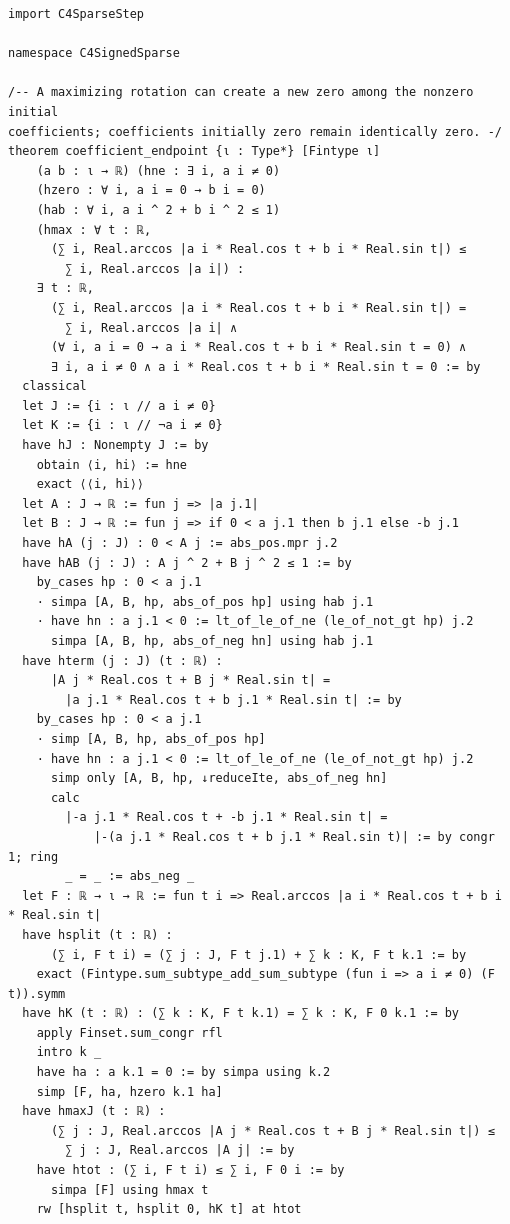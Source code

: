 \documentclass[11pt,a4paper]{article}
\begin{document}
\begin{Verbatim}[breaklines,breakanywhere,fontsize=\footnotesize]
import C4SparseStep

namespace C4SignedSparse

/-- A maximizing rotation can create a new zero among the nonzero initial
coefficients; coefficients initially zero remain identically zero. -/
theorem coefficient_endpoint {ι : Type*} [Fintype ι]
    (a b : ι → ℝ) (hne : ∃ i, a i ≠ 0)
    (hzero : ∀ i, a i = 0 → b i = 0)
    (hab : ∀ i, a i ^ 2 + b i ^ 2 ≤ 1)
    (hmax : ∀ t : ℝ,
      (∑ i, Real.arccos |a i * Real.cos t + b i * Real.sin t|) ≤
        ∑ i, Real.arccos |a i|) :
    ∃ t : ℝ,
      (∑ i, Real.arccos |a i * Real.cos t + b i * Real.sin t|) =
        ∑ i, Real.arccos |a i| ∧
      (∀ i, a i = 0 → a i * Real.cos t + b i * Real.sin t = 0) ∧
      ∃ i, a i ≠ 0 ∧ a i * Real.cos t + b i * Real.sin t = 0 := by
  classical
  let J := {i : ι // a i ≠ 0}
  let K := {i : ι // ¬a i ≠ 0}
  have hJ : Nonempty J := by
    obtain ⟨i, hi⟩ := hne
    exact ⟨⟨i, hi⟩⟩
  let A : J → ℝ := fun j => |a j.1|
  let B : J → ℝ := fun j => if 0 < a j.1 then b j.1 else -b j.1
  have hA (j : J) : 0 < A j := abs_pos.mpr j.2
  have hAB (j : J) : A j ^ 2 + B j ^ 2 ≤ 1 := by
    by_cases hp : 0 < a j.1
    · simpa [A, B, hp, abs_of_pos hp] using hab j.1
    · have hn : a j.1 < 0 := lt_of_le_of_ne (le_of_not_gt hp) j.2
      simpa [A, B, hp, abs_of_neg hn] using hab j.1
  have hterm (j : J) (t : ℝ) :
      |A j * Real.cos t + B j * Real.sin t| =
        |a j.1 * Real.cos t + b j.1 * Real.sin t| := by
    by_cases hp : 0 < a j.1
    · simp [A, B, hp, abs_of_pos hp]
    · have hn : a j.1 < 0 := lt_of_le_of_ne (le_of_not_gt hp) j.2
      simp only [A, B, hp, ↓reduceIte, abs_of_neg hn]
      calc
        |-a j.1 * Real.cos t + -b j.1 * Real.sin t| =
            |-(a j.1 * Real.cos t + b j.1 * Real.sin t)| := by congr 1; ring
        _ = _ := abs_neg _
  let F : ℝ → ι → ℝ := fun t i => Real.arccos |a i * Real.cos t + b i * Real.sin t|
  have hsplit (t : ℝ) :
      (∑ i, F t i) = (∑ j : J, F t j.1) + ∑ k : K, F t k.1 := by
    exact (Fintype.sum_subtype_add_sum_subtype (fun i => a i ≠ 0) (F t)).symm
  have hK (t : ℝ) : (∑ k : K, F t k.1) = ∑ k : K, F 0 k.1 := by
    apply Finset.sum_congr rfl
    intro k _
    have ha : a k.1 = 0 := by simpa using k.2
    simp [F, ha, hzero k.1 ha]
  have hmaxJ (t : ℝ) :
      (∑ j : J, Real.arccos |A j * Real.cos t + B j * Real.sin t|) ≤
        ∑ j : J, Real.arccos |A j| := by
    have htot : (∑ i, F t i) ≤ ∑ i, F 0 i := by
      simpa [F] using hmax t
    rw [hsplit t, hsplit 0, hK t] at htot

\end{Verbatim}
\end{document}
